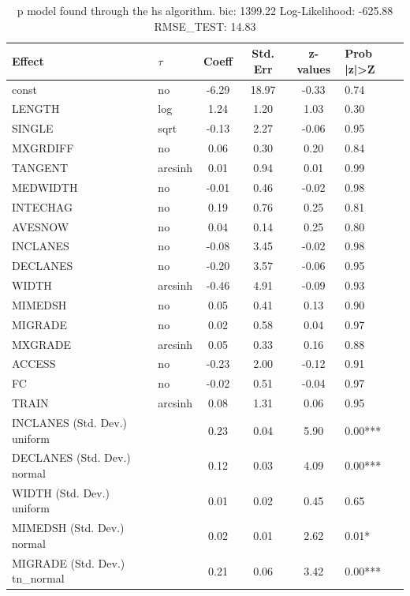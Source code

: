 \begin{table}
	\caption{p model found through the hs algorithm. bic: 1399.22 Log-Likelihood: -625.88 RMSE_TEST: 14.83}
	\begin{center}
		\begin{tabular}{|l|l|c|c|c|l|}
			\hline
			Effect & $\tau$ & Coeff & Std. Err & z-values & Prob |z|>Z \\
			\hline
			const & no & -6.29 & 18.97 & -0.33 & 0.74 \\
			\hline
			LENGTH & log & 1.24 & 1.20 & 1.03 & 0.30 \\
			\hline
			SINGLE & sqrt & -0.13 & 2.27 & -0.06 & 0.95 \\
			\hline
			MXGRDIFF & no & 0.06 & 0.30 & 0.20 & 0.84 \\
			\hline
			TANGENT & arcsinh & 0.01 & 0.94 & 0.01 & 0.99 \\
			\hline
			MEDWIDTH & no & -0.01 & 0.46 & -0.02 & 0.98 \\
			\hline
			INTECHAG & no & 0.19 & 0.76 & 0.25 & 0.81 \\
			\hline
			AVESNOW & no & 0.04 & 0.14 & 0.25 & 0.80 \\
			\hline
			INCLANES & no & -0.08 & 3.45 & -0.02 & 0.98 \\
			\hline
			DECLANES & no & -0.20 & 3.57 & -0.06 & 0.95 \\
			\hline
			WIDTH & arcsinh & -0.46 & 4.91 & -0.09 & 0.93 \\
			\hline
			MIMEDSH & no & 0.05 & 0.41 & 0.13 & 0.90 \\
			\hline
			MIGRADE & no & 0.02 & 0.58 & 0.04 & 0.97 \\
			\hline
			MXGRADE & arcsinh & 0.05 & 0.33 & 0.16 & 0.88 \\
			\hline
			ACCESS & no & -0.23 & 2.00 & -0.12 & 0.91 \\
			\hline
			FC & no & -0.02 & 0.51 & -0.04 & 0.97 \\
			\hline
			TRAIN & arcsinh & 0.08 & 1.31 & 0.06 & 0.95 \\
			\hline
			INCLANES (Std. Dev.) uniform &  & 0.23 & 0.04 & 5.90 & 0.00*** \\
			\hline
			DECLANES (Std. Dev.) normal &  & 0.12 & 0.03 & 4.09 & 0.00*** \\
			\hline
			WIDTH (Std. Dev.) uniform &  & 0.01 & 0.02 & 0.45 & 0.65 \\
			\hline
			MIMEDSH (Std. Dev.) normal &  & 0.02 & 0.01 & 2.62 & 0.01* \\
			\hline
			MIGRADE (Std. Dev.) tn_normal &  & 0.21 & 0.06 & 3.42 & 0.00*** \\

\end{tabular}
\end{center}
\end{table}
